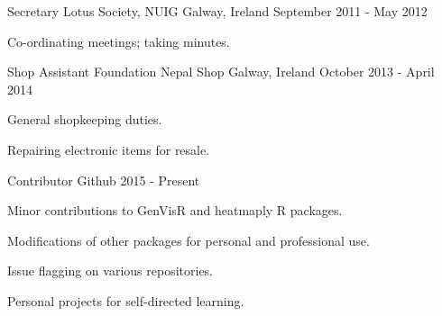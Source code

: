 


\begin{cventries}


\cventry
{Secretary} %
{Lotus Society, NUIG} %
{Galway, Ireland} %
{September 2011 - May 2012} %
{ %
\begin{cvitems}
\item {Co-ordinating meetings; taking minutes.}
\end{cvitems}
}


\cventry
{Shop Assistant} %
{Foundation Nepal Shop} %
{Galway, Ireland} %
{October 2013 - April 2014} %
{ %
\begin{cvitems}
\item {General shopkeeping duties.}
\item {Repairing electronic items for resale.}
\end{cvitems}
}

\cventry
{Contributor} %
{Github} %
{} %
{2015 - Present} %
{ %
\begin{cvitems}
\item {Minor contributions to GenVisR and heatmaply R packages.}
\item {Modifications of other packages for personal and professional use.}
\item {Issue flagging on various repositories.}
\item {Personal projects for self-directed learning.}
\end{cvitems}
}


\end{cventries}
